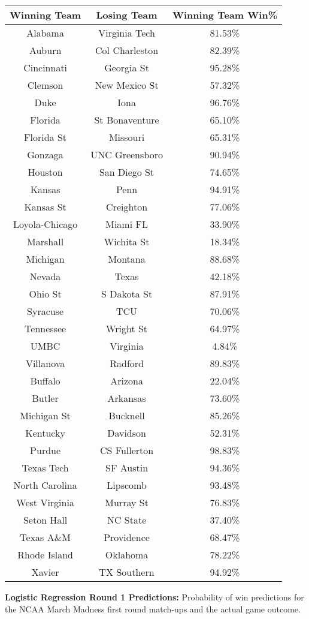 \centering
\begin{tabular}{|c||c|c|} 
\hline
Winning Team & Losing Team & Winning Team Win\%\\ 
\hline
\hline
Alabama & Virginia Tech & 81.53\% \\ \hline
Auburn & Col Charleston & 82.39\% \\ \hline
Cincinnati & Georgia St & 95.28\% \\ \hline
Clemson & New Mexico St & 57.32\% \\ \hline
Duke & Iona & 96.76\% \\ \hline
Florida & St Bonaventure & 65.10\%\\ \hline
Florida St & Missouri & 65.31\% \\ \hline
Gonzaga & UNC Greensboro & 90.94\% \\ \hline
Houston & San Diego St  & 74.65\% \\ \hline
Kansas & Penn & 94.91\%\\ \hline
Kansas St & Creighton & 77.06\% \\ \hline
Loyola-Chicago & Miami FL & 33.90\% \\ \hline
Marshall & Wichita St & 18.34\% \\ \hline
Michigan & Montana & 88.68\% \\ \hline
Nevada & Texas & 42.18\% \\ \hline
Ohio St & S Dakota St & 87.91\%\\ \hline
Syracuse &  TCU & 70.06\% \\ \hline
Tennessee & Wright St & 64.97\% \\ \hline
UMBC & Virginia & 4.84\%\\ \hline
Villanova & Radford & 89.83\% \\ \hline 
Buffalo & Arizona & 22.04\% \\ \hline
Butler & Arkansas & 73.60\% \\ \hline
Michigan St & Bucknell & 85.26\% \\ \hline
Kentucky &  Davidson & 52.31\% \\ \hline
Purdue & CS Fullerton & 98.83\% \\ \hline
Texas Tech & SF Austin & 94.36\% \\\hline
North Carolina & Lipscomb & 93.48\% \\ \hline
West Virginia & Murray St & 76.83\% \\ \hline
Seton Hall & NC State & 37.40\% \\ \hline
Texas A\&M & Providence & 68.47\% \\ \hline
Rhode Island & Oklahoma & 78.22\% \\ \hline
Xavier & TX Southern & 94.92\%\\ \hline
\end{tabular}
\caption{\textbf{Logistic Regression Round 1 Predictions:} Probability of win predictions for the NCAA March Madness first round match-ups and the actual game outcome.}
\label{tab:predictions}